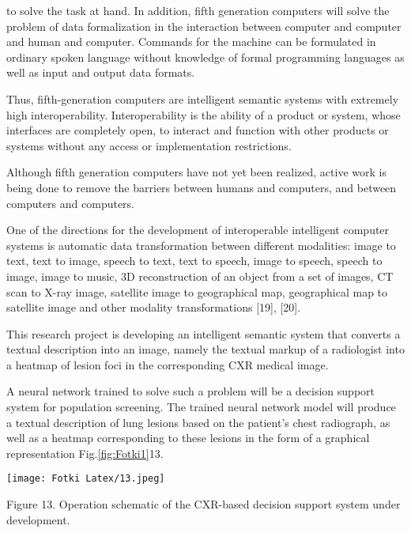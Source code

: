 \documentclass[a4paper]{article}
\begin{document}
\begingroup
\begin{multicols}{2}
to solve the task at hand. In addition, fifth generation
computers will solve the problem of data formalization
in the interaction between computer and computer and
human and computer. Commands for the machine can be
formulated in ordinary spoken language without knowledge of formal programming languages as well as input
and output data formats.\par
Thus, fifth-generation computers are intelligent semantic systems with extremely high interoperability. Interoperability is the ability of a product or system, whose
interfaces are completely open, to interact and function
with other products or systems without any access or
implementation restrictions.\par
Although fifth generation computers have not yet been
realized, active work is being done to remove the barriers
between humans and computers, and between computers
and computers.\par
One of the directions for the development of interoperable intelligent computer systems is automatic
data transformation between different modalities: image
to text, text to image, speech to text, text to speech,
image to speech, speech to image, image to music, 3D
reconstruction of an object from a set of images, CT
scan to X-ray image, satellite image to geographical map,
geographical map to satellite image and other modality
transformations [19], [20].\par
This research project is developing an intelligent semantic system that converts a textual description into an
image, namely the textual markup of a radiologist into a
heatmap of lesion foci in the corresponding CXR medical
image.\par
A neural network trained to solve such a problem will
be a decision support system for population screening.
The trained neural network model will produce a textual
description of lung lesions based on the patient’s chest
radiograph, as well as a heatmap corresponding to these
lesions in the form of a graphical representation Fig.\ref{fig:Fotki1}13.

\begin{cupfigure}{}
\texttt{[image: Fotki Latex/13.jpeg]}
\scriptsize 
    \caption{Figure 13. Operation schematic of the CXR-based decision support system under development.}
    \label{fig:Fotki1}
\end{cupfigure}
    

\end{multicols}
\end{document}
